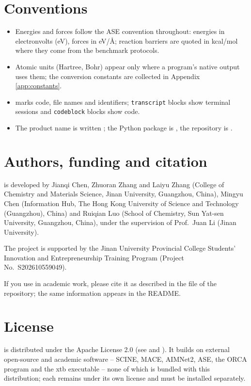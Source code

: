 \section*{Conventions}

\begin{itemize}
  \item Energies and forces follow the ASE convention throughout: energies
    in electronvolts (eV), forces in eV/\AA{}; reaction barriers are quoted
    in kcal/mol where they come from the benchmark protocols.
  \item Atomic units (Hartree, Bohr) appear only where a program's native
    output uses them; the conversion constants are collected in Appendix
    \ref{app:constants}.
  \item {} marks code, file names and identifiers;
    \texttt{transcript} blocks show terminal sessions and
    \texttt{codeblock} blocks show code.
  \item The product name is written \jns{}; the Python package is
    , the repository is
    .
\end{itemize}

\section*{Authors, funding and citation}

\begin{readbox}
\jns{} is developed by Jianqi Chen, Zhuoran Zhang and Laiyu Zhang (College
of Chemistry and Materials Science, Jinan University, Guangzhou, China),
Mingyu Chen (Information Hub, The Hong Kong University of Science and
Technology (Guangzhou), China) and Ruiqian Luo (School of Chemistry,
Sun Yat-sen University, Guangzhou, China), under the supervision of
Prof.\ Juan Li (Jinan University).

The project is supported by the Jinan University Provincial College
Students' Innovation and Entrepreneurship Training Program
(Project No.\ S202610559049).
\end{readbox}

If you use \jns{} in academic work, please cite it as described in the
 file of the repository; the same information appears in
the README.

\section*{License}

\jns{} is distributed under the Apache License 2.0 (see  and
).  It builds on external open-source and academic software --
SCINE, MACE, AIMNet2, ASE, the ORCA program and the xtb executable -- none
of which is bundled with this distribution; each remains under its own
license and must be installed separately.
